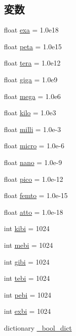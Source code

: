 \subsection*{変数}
\begin{DoxyCompactItemize}
\item 
float \hyperlink{namespacem5_1_1util_1_1convert_a2d9e7604d19ada1e98cbafc4f7e56461}{exa} = 1.0e18
\item 
float \hyperlink{namespacem5_1_1util_1_1convert_a160e6677df7cf242744398caa5ae1e40}{peta} = 1.0e15
\item 
float \hyperlink{namespacem5_1_1util_1_1convert_a32a8bbedfcc3c952b61323cd7d29adda}{tera} = 1.0e12
\item 
float \hyperlink{namespacem5_1_1util_1_1convert_a8cfa600bfef7e56f383c6593b6cfac0d}{giga} = 1.0e9
\item 
float \hyperlink{namespacem5_1_1util_1_1convert_a9e5596c461731dc21199306ebdcab697}{mega} = 1.0e6
\item 
float \hyperlink{namespacem5_1_1util_1_1convert_ad10e7a711d4c42e25ba54fd9e6c6db03}{kilo} = 1.0e3
\item 
float \hyperlink{namespacem5_1_1util_1_1convert_a0b4e4acb6778f405dc03c18089cf2bf3}{milli} = 1.0e-\/3
\item 
float \hyperlink{namespacem5_1_1util_1_1convert_a0fab3b5d117138c9a9f06197c5dc6acc}{micro} = 1.0e-\/6
\item 
float \hyperlink{namespacem5_1_1util_1_1convert_a1f1c70f351f7a02a4b8de9fdc2d44733}{nano} = 1.0e-\/9
\item 
float \hyperlink{namespacem5_1_1util_1_1convert_a30f7f909031dbbb4eac6be764e7b6d50}{pico} = 1.0e-\/12
\item 
float \hyperlink{namespacem5_1_1util_1_1convert_adabbae2fc2dbe321cd2e88e7943bb4dc}{femto} = 1.0e-\/15
\item 
float \hyperlink{namespacem5_1_1util_1_1convert_a3c5ef72b64145ba7f3e41c96c8fcc11c}{atto} = 1.0e-\/18
\item 
int \hyperlink{namespacem5_1_1util_1_1convert_a67cbe91a38a84b1890ba95c9e9ab981e}{kibi} = 1024
\item 
int \hyperlink{namespacem5_1_1util_1_1convert_a2cb7c6a30a70c665664bbc4cc02a232d}{mebi} = 1024
\item 
int \hyperlink{namespacem5_1_1util_1_1convert_abebda0dbd8cd53070399ee7fd36d231f}{gibi} = 1024
\item 
int \hyperlink{namespacem5_1_1util_1_1convert_a714b0db8cca3a346569b96a27745c4b7}{tebi} = 1024
\item 
int \hyperlink{namespacem5_1_1util_1_1convert_a48d8050e3a0f762ee4eb967a9ff70533}{pebi} = 1024
\item 
int \hyperlink{namespacem5_1_1util_1_1convert_a1b6f03a8e33f35c80c714a13d0ad67e0}{exbi} = 1024
\item 
dictionary \hyperlink{namespacem5_1_1util_1_1convert_a7b65d6044db54fa04901d167d56f1abb}{\_\-bool\_\-dict}
\end{DoxyCompactItemize}


